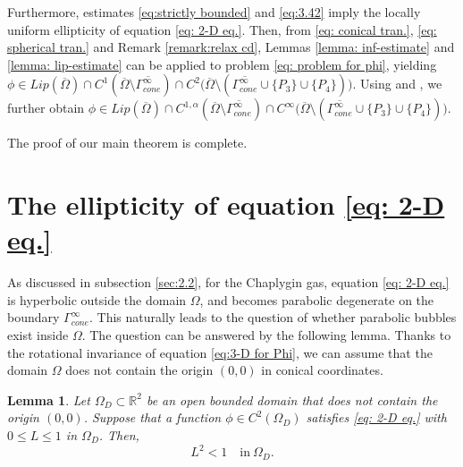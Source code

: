 \documentclass[reqno,12pt]{amsart}
\newtheorem{lemma}{Lemma}[section]
\numberwithin{equation}{section}
\begin{document}
Furthermore, estimates \eqref{eq:strictly bounded} and \eqref{eq:3.42} imply the locally uniform ellipticity of equation \eqref{eq: 2-D eq.}. Then, from \eqref{eq: conical tran.}, \eqref{eq: spherical tran.} and Remark \ref{remark:relax cd},  Lemmas \ref{lemma: inf-estimate} and \ref{lemma: lip-estimate} can be applied to problem \eqref{eq: problem for phi}, yielding $\phi\in Lip(\overline{\Omega})\cap C^{1}(\overline{\Omega}\setminus\overline{\Gamma_{cone}^{\infty}})\cap C^2\big(\overline{\Omega}\setminus(\overline{\Gamma_{cone}^{\infty}}\cup\{P_3\}\cup\{P_4\})\big)$. Using \cite[Theorem 6.17]{GT01} and \cite[Lemma 1.3]{Lieb88}, we further obtain $\phi\in Lip(\overline{\Omega})\cap C^{1,\alpha}(\overline{\Omega}\setminus\overline{\Gamma_{cone}^{\infty}})\cap C^\infty\big(\overline{\Omega}\setminus(\overline{\Gamma_{cone}^{\infty}}\cup\{P_3\}\cup\{P_4\})\big)$.

The proof of our main theorem is complete.

\appendix

\section{The ellipticity of equation \texorpdfstring{\eqref{eq: 2-D eq.}}{(2-D eq.)}}\label{sec:appendix a}
 As discussed in subsection \ref{sec:2.2}, for the Chaplygin gas, equation \eqref{eq: 2-D eq.} is hyperbolic outside the domain $\Omega$, and becomes parabolic degenerate on the boundary $\Gamma_{cone}^{\infty}$. This naturally leads to the question of whether parabolic bubbles exist inside $\Omega$. The question can be answered by the following lemma. Thanks to the rotational invariance of equation \mbox{\eqref{eq:3-D for Phi}}, we can assume that the domain $\Omega$ does not contain the origin $(0,0)$ in conical coordinates.
 \begin{lemma}\label{DeYu-1}
	Let $\Omega_D\subset \mathbb{R}^{2}$ be an open bounded domain that does not contain the origin $(0,0)$. Suppose that a function $\phi\in C^2(\Omega_D)$ satisfies \eqref{eq: 2-D eq.} with $0\leq L\leq1$ in $\Omega_D$. Then,
	\begin{equation*}
	    L^2<1\quad\text{in}~\Omega_D.
	\end{equation*}
\end{lemma}
\end{document}
